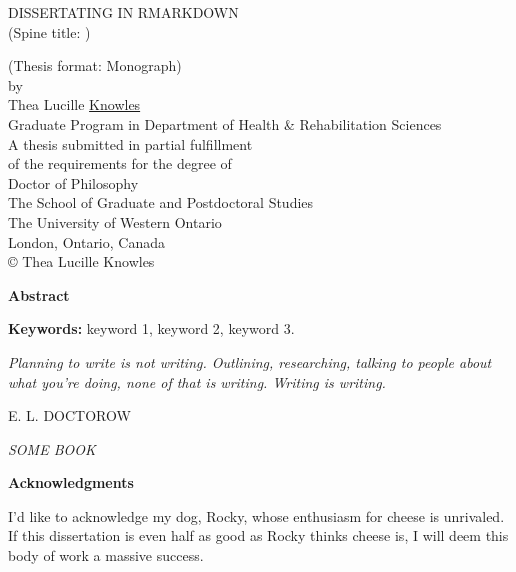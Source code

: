 \documentclass[
  12pt,
  oneside]{book}
\date{}
\makeatletter
\newlength\longest
\numberwithin{figure}{chapter}
\newenvironment{preliminary}%
{\pagestyle{plain}\pagenumbering{roman}}%
{\pagenumbering{arabic}}
\newcommand\isco[1]{%
  \edef\@tempa{#1}%
  \def\@tempb{}%
  \ifx\@tempa\@tempb
	\else \\\underline{Co-Supervisor:}\vspace{0.35in}\\\dots\dots\dots\dots\dots\dots\dots\\{#1}\\
  \fi
}
\newcommand\isjoint[1]{%
  \edef\@tempa{#1}%
  \def\@tempb{}%
  \ifx\@tempa\@tempb
	\else \\\underline{Joint Supervisor:}\vspace{0.35in}\\\dots\dots\dots\dots\dots\dots\dots\\{#1}\\
  \fi
}
\newcommand\isalt[1]{%
  \edef\@tempa{#1}%
  \def\@tempb{}%
  \ifx\@tempa\@tempb
	\else \\\underline{Alternate Supervisor:}\vspace{0.35in}\\\dots\dots\dots\dots\dots\dots\dots\\{#1}\\
  \fi
}
\newcommand\isdefinedsig[1]{%
  \edef\@tempa{#1}%
  \def\@tempb{}%
  \ifx\@tempa\@tempb
	\else \\ \dots\dots\dots\dots\dots\dots\dots\\{#1}\\
  \fi
}
\newcommand\isdefinedspinetitle[1]{%
  \edef\@tempa{#1}%
  \def\@tempb{}%
  \ifx\@tempa\@tempb
	\else (Spine title: #1)\\
  \fi
}
\newcommand\coauthor[1]{%
  \edef\@tempa{#1}%
  \def\@tempb{}%
  \ifx\@tempa\@tempb
	\else \newpage \Large Co-Authorship Statement\normalsize\\\indent\\#1\\
  \fi
}
\newcommand\acknowlege[1]{%
  \edef\@tempa{#1}%
  \def\@tempb{}%
  \ifx\@tempa\@tempb
	\else \newpage \Large Acknowledgements\normalsize\\\indent\\#1\newpage
  \fi
}
\newcommand{\super}{Dr. Supervisor} %
\newcommand{\superc}{} %
\newcommand{\supera}{} %
\newcommand{\scob}{Dr. Committee Member 1}  %
\newcommand{\scoc}{Dr. Committee Member 2}  %
\newcommand{\sct}{}  %
\newcommand{\examo}{Dr. Examiner 1}  %
\newcommand{\examt}{Dr. Examiner 2}
\newcommand{\examth}{Dr. Examiner 3}
\newcommand{\examf}{Dr. Examiner 4}
\newcommand{\department}{Department of Health \& Rehabilitation Sciences}
\newcommand{\degree}{Doctor of Philosophy}
\newcommand{\firstname}{Thea}
\newcommand{\middlename}{Lucille}
\newcommand{\lastname}{Knowles}
\newcommand{\authorname}{{\firstname} {\middlename} {\lastname}}
\newcommand{\titl}{Dissertating in RMarkdown}
\newcommand{\spinetitle}{}%
\newcommand{\thesisformat}{Monograph} %
\newcommand{\gyear}{\number\year}
\newcommand{\makecoauthor}{}
\newcommand{\makeacknowlege} {
}
\renewcommand{\maketitle}
{\begin{titlepage}
   \setcounter{page}{1}
   \begin{large}
   \begin{center}
      \mbox{}
      \vfill
      {\MakeUppercase{\titl}}\\
      \isdefinedspinetitle{\spinetitle}
      (Thesis format: \thesisformat)\\
      \vfill
      by \\
      \vfill
      {\firstname{} \middlename } \underline{\lastname}\\
      \vfill
      Graduate Program in {\department}\\
      \vfill
		A thesis submitted in partial fulfillment\\
		of the requirements for the degree of\\
		\degree\\
		\vfill
		The School of Graduate and Postdoctoral Studies\\
		The University of Western Ontario\\
		London, Ontario, Canada\\
		\vfill
      {\copyright} {\authorname} {\gyear}  \\
      \vspace*{.2in}
   \end{center}
   \end{large}
   \end{titlepage}

}%
\newcommand{\makecert}{
   \setcounter{page}{2}
\vfill
\begin{center}
\large
WESTERN UNIVERSITY\\
School of Graduate and Postdoctoral Studies\\
\vfill
\textbf{CERTIFICATE OF EXAMINATION}
\end{center}

\vfill
\begin{table}[ht]
\begin{minipage}[t]{0.5\linewidth} %
\begin{tabular}{l}
\underline{Supervisor:}\vspace{0.35in}
\isdefinedsig{\super}
\isco{\superc}
\isjoint{\superj}
\isalt{\supera}
\\
\end{tabular}
\vfill
\end{minipage}
\hspace{0.5in}
\begin{minipage}[t]{0.5\linewidth}
\begin{tabular}{l}
\underline{Examiners:} \\\vspace{.5cm}
\isdefinedsig{\examo}\\
\isdefinedsig{\examt}\\
\isdefinedsig{\examth}\\
\isdefinedsig{\examf}
\end{tabular}
\vfill
\end{minipage}
\vfill
\end{table}
\vfill
\begin{center}
The thesis by \\ \vfill
\textbf{\firstname{} \middlename{} \underline{\lastname}}\\
\vfill
entitled:\\\vfill
\textbf{\titl}\\\vfill
is accepted in partial fulfillment of the \\
requirements for the degree of\\
\degree\\
\end{center}
\begin{table}[ht]
\begin{minipage}[t]{0.5\linewidth}
\begin{tabular}{l}
\dots\dots\dots\dots\dots\\
Date
\end{tabular}
\end{minipage}
\hspace{0.5in}
\begin{minipage}[t]{0.5\linewidth}
\begin{tabular}{l}
\dots\dots\dots\dots\dots\dots\dots\dots\dots\dots\\
Chair of the Thesis Examination Board
\end{tabular}
\end{minipage}
\end{table}

}
\makeatother
\begin{document}
\frontmatter


\begin{preliminary}

\maketitle
\newpage


\setcounter{page}{2}
\Large\begin{center}\textbf{Abstract}\end{center}\normalsize
%

\vfill
\noindent\textbf{Keywords:} keyword 1, keyword 2, keyword 3.
\newpage




\clearpage

\thispagestyle{empty}
\null\vfill
{
	\settowidth{}
	\centering
	\hspace{3cm}\parbox{\longest}{%
		\raggedright{\Large\itshape%
      Planning to write is not writing. Outlining, researching, talking to people about what you're doing, none of that is writing. Writing is writing.\par\bigskip
		}   
		\raggedleft\MakeUppercase{E. L. Doctorow}\par%
		\raggedleft\MakeUppercase{\textit{Some book}}\par%
}}

\vfill\vfill

\newpage


\Large\begin{center}\textbf{Acknowledgments}\end{center}\normalsize
%
I'd like to acknowledge my dog, Rocky, whose enthusiasm for cheese is unrivaled. If this dissertation is even half as good as Rocky thinks cheese is, I will deem this body of work a massive success.


\end{preliminary}
\end{document}
